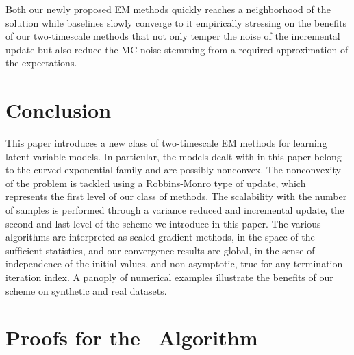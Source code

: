 \documentclass[bj]{imsart}
\numberwithin{equation}{section}
\theoremstyle{plain}
\begin{document}
Both our newly proposed EM methods quickly reaches a neighborhood of the solution while baselines slowly converge to it empirically stressing on the benefits of our two-timescale methods that not only temper the noise of the incremental update but also reduce the MC noise stemming from a required approximation of the expectations.



\vspace{-0.05in}
\section{Conclusion}
\vspace{-0.05in}

This paper introduces a new class of two-timescale EM methods for learning latent variable models.
In particular, the models dealt with in this paper belong to the curved exponential family and are possibly nonconvex.
The nonconvexity of the problem is tackled using a Robbins-Monro type of update, which represents the {first level} of our class of methods.
The scalability with the number of samples is performed through a variance reduced and incremental update, the {second} and last level of the scheme we introduce in this paper.
The various algorithms are interpreted as scaled gradient methods, in the space of the sufficient statistics, and our convergence results are {global}, in the sense of independence of the initial values, and {non-asymptotic}, \ie true for any termination iteration index.
A panoply of numerical examples illustrate the benefits of our scheme on synthetic and real datasets.





\newpage


\newpage




\appendix

\section{Proofs for the \ISAEM\ Algorithm}
\end{document}
